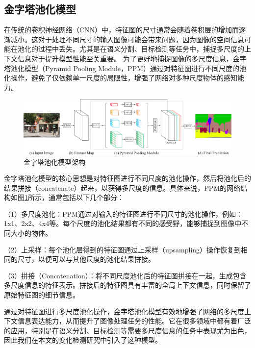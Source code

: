 \documentclass[lang=chs, degree=master, blindreview=false, adobe=false]{yanputhesis}
\begin{document}
\subsection{金字塔池化模型}
在传统的卷积神经网络（CNN）中，特征图的尺寸通常会随着卷积层的增加而逐渐减小。这对于处理不同尺寸的输入图像可能会带来问题，因为图像的空间信息可能在池化的过程中丢失。尤其是在语义分割、目标检测等任务中，捕捉多尺度的上下文信息对于提升模型性能至关重要。
为了更好地捕捉图像的多尺度信息，金字塔池化模型（Pyramid Pooling Module，PPM）通过对特征图进行不同尺度的池化操作，避免了仅依赖单一尺度的局限性，增强了网络对多种尺度物体的感知能力。
\begin{figure}[htb]
  \centering
  \includegraphics[scale=0.35]{images/PPM.png}
  \caption{
    金字塔池化模型架构\cite{zhao2017PPM}
  }
  \label{fig:PPMfram}
\end{figure}

金字塔池化模型的核心思想是对特征图进行不同尺度的池化操作，然后将池化后的结果拼接（concatenate）起来，以获得多尺度的信息。具体来说，PPM的网络结构如图\ref{fig:PPMfram}所示，通常包括以下几个部分：

（1）多尺度池化：PPM通过对输入的特征图进行不同尺寸的池化操作，例如：1x1、2x2、4x4等。每个尺度的池化结果都有不同的感受野，能够捕捉到图像中不同大小的物体。

（2）上采样：每个池化层得到的特征图通过上采样（upsampling）操作恢复到相同的尺寸，以便可以与其他尺度的池化结果拼接。

（3）拼接（Concatenation）：将不同尺度池化后的特征图拼接在一起，生成包含多尺度信息的特征表示。拼接后的特征图具有丰富的全局上下文信息，同时保留了原始特征图的细节信息。

通过对特征图进行多尺度池化操作，金字塔池化模型有效地增强了网络的多尺度上下文信息表达能力，从而提升了图像处理任务的性能。它在很多领域中都有着广泛的应用，特别是在语义分割、目标检测等需要多尺度信息的任务中表现尤为出色，因此我们在本文的变化检测研究中引入了这种模型。
\end{document}
